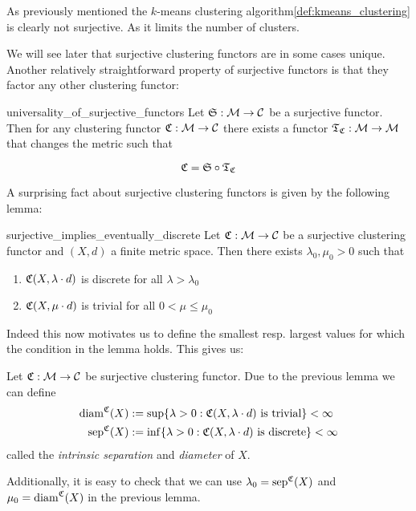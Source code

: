 As previously mentioned the $k$-means clustering algorithm\ref{def:kmeans_clustering} is clearly not surjective. As it limits the number of clusters.

We will see later that surjective clustering functors are in some cases unique. Another relatively straightforward property of surjective functors is that they factor any other clustering functor:

\begin{proposition}{}{universality_of_surjective_functors}
Let $\mathfrak{S}: \mathcal{M} \to \mathcal{C}$ be a surjective functor. Then for any clustering functor $\mathfrak{C}: \mathcal{M} \to \mathcal{C}$ there exists a functor $\mathfrak{T}_{\mathfrak{C}}: \mathcal{M} \to \mathcal{M}$ that changes the metric such that

\begin{equation*}
\mathfrak{C} = \mathfrak{S} \circ \mathfrak{T}_{\mathfrak{C}}
\end{equation*}
\end{proposition}

A surprising fact about surjective clustering functors is given by the following lemma:

\begin{lemma}{}{surjective_implies_eventually_discrete}
Let $\mathfrak{C}: \mathcal{M} \to \mathcal{C}$ be a surjective clustering functor and $(X,d)$ a finite metric space. Then there exists $\lambda_0, \mu_0 > 0$ such that
\begin{enumerate}
    \item $\mathfrak{C}(X,\lambda \cdot d)$ is discrete for all $\lambda > \lambda_0$
    \item $\mathfrak{C}(X,\mu \cdot d)$ is trivial for all $0 < \mu \le \mu_0$
\end{enumerate}
\end{lemma}

Indeed this now motivates us to define the smallest resp. largest values for which the condition in the lemma holds. This gives us:

\begin{definition}{}{}
Let $\mathfrak{C}: \mathcal{M} \to \mathcal{C}$ be surjective clustering functor. Due to the previous lemma we can define
\begin{align*}
\mathrm{diam}^{\mathfrak{C}}(X) &:= \sup\{ \lambda > 0: \mathfrak{C}(X,\lambda \cdot d) \text{ is trivial}\} < \infty\\
\mathrm{sep}^{\mathfrak{C}}(X) &:= \inf\{ \lambda > 0: \mathfrak{C}(X,\lambda \cdot d) \text{ is discrete}\} < \infty
\end{align*}
called the \emph{intrinsic separation} and \emph{diameter} of $X$. 
\end{definition}
Additionally, it is easy to check that we can use $\lambda_0 = \mathrm{sep}^{\mathfrak{C}}(X)$ and $\mu_0 = \mathrm{diam}^{\mathfrak{C}}(X)$ in the previous lemma.

